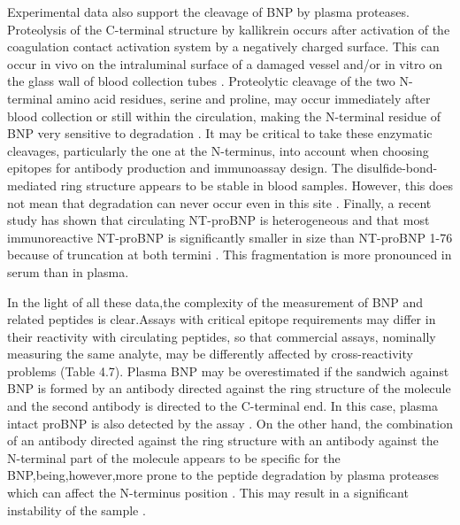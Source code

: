 \documentclass[14pt,a4paper,onecolumn]{extarticle}
\begin{document}
Experimental data also support the cleavage of BNP by plasma proteases. Proteolysis of the C-terminal structure by kallikrein occurs after activation of the coagulation
contact activation system by a negatively charged surface. This can occur in vivo on the
intraluminal surface of a damaged vessel and/or in vitro on the glass wall of blood collection tubes \citep{bib282} \citep{bib283}. Proteolytic cleavage of the two N-terminal amino acid residues,
serine and proline, may occur immediately after blood collection or still within the circulation, making the N-terminal residue of BNP very sensitive to degradation \citep{bib278}. It may
be critical to take these enzymatic cleavages, particularly the one at the N-terminus,
into account when choosing epitopes for antibody production and immunoassay design.
The disulfide-bond-mediated ring structure appears to be stable in blood samples.
However, this does not mean that degradation can never occur even in this site \citep{bib283}.
Finally, a recent study has shown that circulating NT-proBNP is heterogeneous and that
most immunoreactive NT-proBNP is significantly smaller in size than NT-proBNP 1-76
because of truncation at both termini \citep{bib284}. This fragmentation is more pronounced in
serum than in plasma.

In the light of all these data,the complexity of the measurement of BNP and related peptides is clear.Assays with critical epitope requirements may differ in their reactivity with circulating peptides, so that commercial assays, nominally measuring the same analyte, may
be differently affected by cross-reactivity problems (Table 4.7). Plasma BNP may be overestimated if the sandwich against BNP is formed by an antibody directed against the ring
structure of the molecule and the second antibody is directed to the C-terminal end. In this
case, plasma intact proBNP is also detected by the assay \citep{bib278}. On the other hand, the combination of an antibody directed against the ring structure with an antibody against the
N-terminal part of the molecule appears to be specific for the BNP,being,however,more prone
to the peptide degradation by plasma proteases which can affect the N-terminus position
\citep{bib263} \citep{bib277} \citep{bib278}. This may result in a significant instability of the sample \citep{bib270}.
\end{document}
